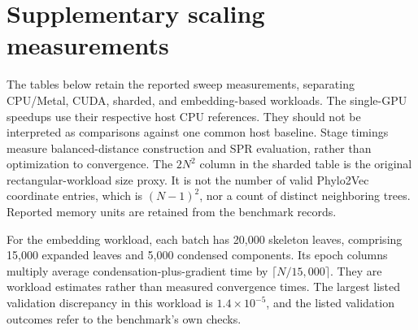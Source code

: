 

\clearpage
\section{Supplementary scaling measurements}
\label{sec:scaling_tables}

The tables below retain the reported sweep measurements, separating CPU/Metal, CUDA, sharded, and embedding-based workloads.
The single-GPU speedups use their respective host CPU references.
They should not be interpreted as comparisons against one common host baseline.
Stage timings measure balanced-distance construction and SPR evaluation, rather than optimization to convergence.
The $2N^2$ column in the sharded table is the original rectangular-workload size proxy.
It is not the number of valid Phylo2Vec coordinate entries, which is $(N-1)^2$, nor a count of distinct neighboring trees.
Reported memory units are retained from the benchmark records.

For the embedding workload, each batch has 20,000 skeleton leaves, comprising 15,000 expanded leaves and 5,000 condensed components.
Its epoch columns multiply average condensation-plus-gradient time by
$\lceil N/15{,}000\rceil$.
They are workload estimates rather than measured convergence times.
The largest listed validation discrepancy in this workload is $1.4\times10^{-5}$, and the listed validation outcomes refer to the benchmark's own checks.


